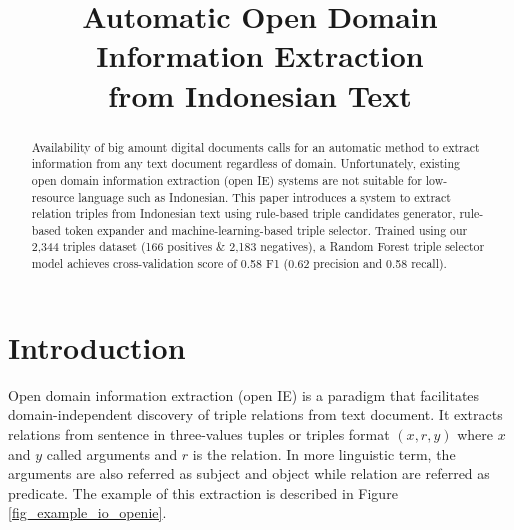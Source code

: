 \documentclass[conference,compsoc]{IEEEtran}
\begin{document}
\title{Automatic Open Domain Information Extraction\\from Indonesian Text}


\author{
	\and
}


\maketitle

\begin{abstract}

Availability of big amount digital documents calls for an automatic method to extract information from any text document regardless of domain. Unfortunately, existing open domain information extraction (open IE) systems are not suitable for low-resource language such as Indonesian. This paper introduces a system to extract relation triples from Indonesian text using rule-based triple candidates generator, rule-based token expander and machine-learning-based triple selector. Trained using our 2,344 triples dataset (166 positives \& 2,183 negatives), a Random Forest triple selector model achieves cross-validation score of 0.58 F1 (0.62 precision and 0.58 recall).

\end{abstract}


\section{Introduction}

Open domain information extraction (open IE) is a paradigm that facilitates domain-independent discovery of triple relations from text document\cite{banko2007open}. It extracts relations from sentence in three-values tuples or triples format $(x, r, y)$ where $x$ and $y$ called arguments and $r$ is the relation\cite{etzioni2011open}. In more linguistic term, the arguments are also referred as subject and object while relation are referred as predicate\cite{angeli2015leveraging}. The example of this extraction is described in Figure \ref{fig_example_io_openie}.
\end{document}
